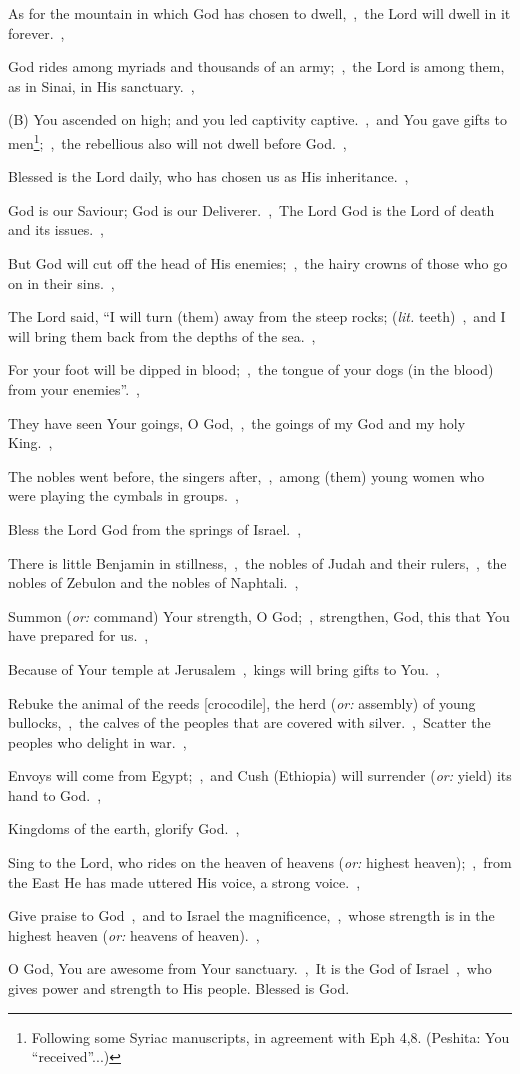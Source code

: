 \documentclass[12pt,twoside,a5paper]{article}
\newcommand{\translationoption}[1]{\emph{or:} #1}
\newcommand{\translationliteral}[1]{\emph{lit.} #1}
\begin{document}
\begin{normalparskip}
  As for the mountain in which God has chosen to dwell,~\sep\ the Lord will dwell in it forever.~\sep

  God rides among myriads and thousands of an army;~\sep\ the Lord is among them, as in Sinai, in His sanctuary.~\sep

  (B) You ascended on high; and you led captivity captive.~\sep\ and You gave gifts to men\footnote{Following some Syriac manuscripts, in agreement with Eph 4,8. (Peshita: You ``received''...)};~\sep\ the rebellious also will not dwell before God.~\sep

  Blessed is the Lord daily, who has chosen us as His inheritance.~\sep

  God is our Saviour; God is our Deliverer.~\sep\ The Lord God is the Lord of death and its issues.~\sep

  But God will cut off the head of His enemies;~\sep\ the hairy crowns of those who go on in their sins.~\sep

  The Lord said, ``I will turn (them) away from the steep rocks; (\translationliteral{teeth})~\sep\ and I will bring them back from the depths of the sea.~\sep

  For your foot will be dipped in blood;~\sep\ the tongue of your dogs (in the blood) from your enemies''.~\sep

  They have seen Your goings, O God,~\sep\ the goings of my God and my holy King.~\sep

  The nobles went before, the singers after,~\sep\ among (them) young women who were playing the cymbals in groups.~\sep

  Bless the Lord God from the springs of Israel.~\sep

  There is little Benjamin in stillness,~\sep\ the nobles of Judah and their rulers,~\sep\ the nobles of Zebulon and the nobles of Naphtali.~\sep

  Summon (\translationoption{command}) Your strength, O God;~\sep\ strengthen, God, this that You have prepared for us.~\sep

  Because of Your temple at Jerusalem~\sep\ kings will bring gifts to You.~\sep

  Rebuke the animal of the reeds [crocodile], the herd (\translationoption{assembly}) of young bullocks,~\sep\ the calves of the peoples that are covered with silver.~\sep\ Scatter the peoples who delight in war.~\sep

  Envoys will come from Egypt;~\sep\ and Cush (Ethiopia) will surrender (\translationoption{yield}) its hand to God.~\sep

  Kingdoms of the earth, glorify God.~\sep

  Sing to the Lord, who rides on the heaven of heavens (\translationoption{highest heaven});~\sep\ from the East He has made uttered His voice, a strong voice.~\sep

  Give praise to God~\sep\ and to Israel the magnificence,~\sep\ whose strength is in the highest heaven (\translationoption{heavens of heaven}).~\sep

  O God, You are awesome from Your sanctuary.~\sep\ It is the God of Israel~\sep\ who gives power and strength to His people. Blessed is God.
\end{normalparskip}
\end{document}
